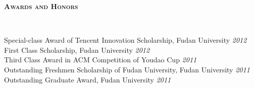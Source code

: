 \documentclass[9pt]{article}
\newenvironment{changemargin}[2]{%
  \begin{list}{}{%
    \setlength{\topsep}{0pt}%
    \setlength{\leftmargin}{#1}%
    \setlength{\rightmargin}{#2}%
    \setlength{\listparindent}{\parindent}%
    \setlength{\itemindent}{\parindent}%
    \setlength{\parsep}{\parskip}%
  }%
  \item[]}{\end{list}
}
\newcommand{\lineover}{
	\begin{changemargin}{-0.05in}{-0.05in}
		\vspace*{-8pt}
		\hrulefill \\
		\vspace*{-2pt}
	\end{changemargin}
}
\newcommand{\header}[1]{
	\begin{changemargin}{-0.5in}{-0.5in}
		\scshape{#1}\\
  	\lineover
	\end{changemargin}
}
\newenvironment{body} {
	\vspace*{-16pt}
	\begin{changemargin}{-0.25in}{-0.5in}
  }	
	{\end{changemargin}
}
\begin{document}
\header{\textbf{Awards and Honors}}

\begin{body}
	\vspace{14pt}
    Special-class Award of Tencent Innovation Scholarship, Fudan University \hfill{} \emph{2012}\\
    \smallskip
    First Class Scholarship, Fudan University \hfill{} \emph{2012}\\
    \smallskip
    Third Class Award in ACM Competition of Youdao Cup  \hfill{} \emph{2011}\\
    \smallskip
    Outstanding Freshmen Scholarship of Fudan University, Fudan University \hfill{} \emph{2011}\\
    \smallskip
    Outstanding Graduate Award, Fudan University \hfill{} \emph{2011}\\
	\smallskip	
\end{body}
\end{document}

